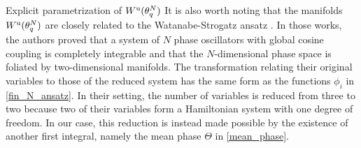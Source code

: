 \documentclass{article}
\theoremstyle{definition}
\newcommand{\jump}{\hfill\break}
\newcommand{\N}{\mathbb{N}}
\renewcommand{\u}{\textnormal{u}}
\begin{document}
\begin{section}{Explicit parametrization of $W^\u(\theta^N_q)$}
It is also worth noting that the manifolds $W^\u(\theta^N_q)$ are closely related to the Watanabe-Strogatz ansatz \cite{watanabe1993integrability,watanabe1994constants}. In those works, the authors proved that a system of $N$ phase oscillators with global cosine coupling is completely integrable and that the $N$-dimensional phase space is foliated by two-dimensional manifolds. The transformation relating their original variables to those of the reduced system has the same form as the functions $\phi_i$ in \eqref{fin_N_ansatz}. In their setting, the number of variables is reduced from three to two because two of their variables form a Hamiltonian system with one degree of freedom. In our case, this reduction is instead made possible by the existence of another first integral, namely the mean phase $\Theta$ in \eqref{mean_phase}.
\end{section}




\end{document}
